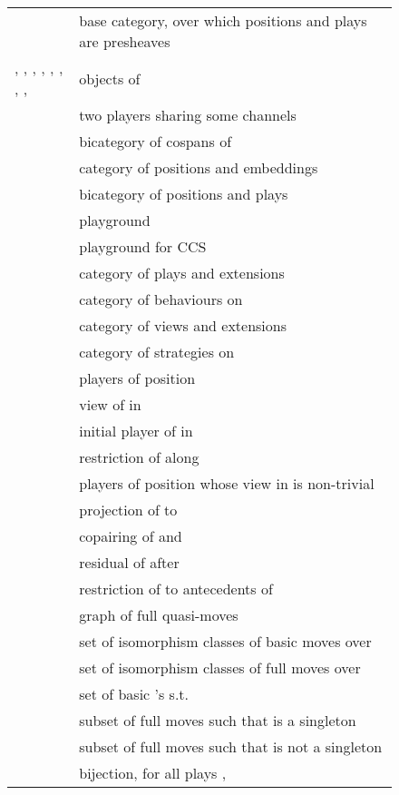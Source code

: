 \documentclass{LMCS}
\theoremstyle{plain}\newtheorem{satz}[thm]{Satz}
\begin{document}
  \begin{figure}[p]
\vspace*{-2em}    \begin{multicols}{2}
\hspace*{-4em}      \begin{tabular}{lp{.8\linewidth}}
         & base category, over which positions and plays are presheaves \\
        \begin{minipage}[t]{.3\linewidth}
          \raggedright , , , , ,
          , , , 
        \end{minipage} & objects of  \\
         &
        two players sharing some channels \\
         & bicategory of cospans of  \\
         & category of positions and embeddings \\
         & bicategory of positions and plays \\
         & playground \\

& playground for CCS \\
         & category of plays and extensions \\
         & category of behaviours on  \\
         & category of views and extensions \\
         & category of strategies on  \\
         & players of position  \\
         & view of  in  \\
         & initial player of  in  \\
         & 
        restriction of  along  \\
         & players of position  whose view in  is non-trivial \\
         & projection of  to  \\
         & copairing of  and  \\
         & residual of  after  \\
         & restriction of  to antecedents of  \\
         & graph of full quasi-moves \\
 & set of isomorphism classes of basic moves over  \\
         & set of isomorphism classes of full moves over  \\
         & set of basic 's s.t.\   \\
         & subset of full moves  such
        that  is a singleton \\
         & subset of full moves  such
        that  is not a singleton \\
         &
        bijection, for all plays , 
         \\


\end{tabular}
\end{multicols}
\end{figure}
\end{document}
